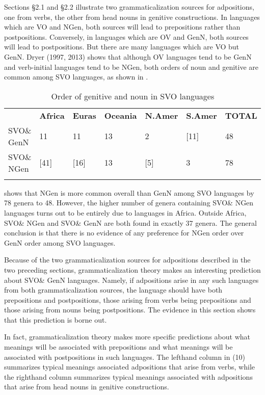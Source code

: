 \documentclass[output=paper]{langsci/langscibook}
\begin{document}
Sections §2.1 and §2.2 illustrate two grammaticalization sources for adpositions, one from verbs, the other from head nouns in genitive constructions. In languages which are VO and NGen, both sources will lead to prepositions rather than postpositions. Conversely, in languages which are OV and GenN, both sources will lead to postpositions. But there are many languages which are VO but GenN. Dryer (1997, 2013) shows that although OV languages tend to be GenN and verb-initial languages tend to be NGen, both orders of noun and genitive are common among SVO languages, as shown in .

\begin{table}
\begin{tabularx}{\textwidth}{XXXXXXX} 
\lsptoprule
& \bfseries Africa & \bfseries Euras & \bfseries Oceania & \bfseries N.Amer & \bfseries S.Amer & \bfseries TOTAL\\
SVO\& GenN & 11 & 11 & 13 & 2 & [11] & 48\\
SVO\& NGen & [41] & [16] & 13 & [5] & 3 & 78\\
\lspbottomrule
\end{tabularx}
\caption{\label{tab:dryer:5}Order of genitive and noun in SVO languages}
\end{table}


 shows that NGen is more common overall than GenN among SVO languages by 78 genera to 48. However, the higher number of genera containing SVO\& NGen languages turns out to be entirely due to languages in Africa. Outside Africa, SVO\& NGen and SVO\& GenN are both found in exactly 37 genera. The general conclusion is that there is no evidence of any preference for NGen order over GenN order among SVO languages.

Because of the two grammaticalization sources for adpositions described in the two preceding sections, grammaticalization theory makes an interesting prediction about SVO\& GenN languages. Namely, if adpositions arise in any such languages from both grammaticalization sources, the language should have both prepositions and postpositions, those arising from verbs being prepositions and those arising from nouns being postpositions. The evidence in this section shows that this prediction is borne out.

In fact, grammaticalization theory makes more specific predictions about what meanings will be associated with prepositions and what meanings will be associated with postpositions in such languages. The lefthand column in (10) summarizes typical meanings associated adpositions that arise from verbs, while the righthand column summarizes typical meanings associated with adpositions that arise from head nouns in genitive constructions.
\end{document}
